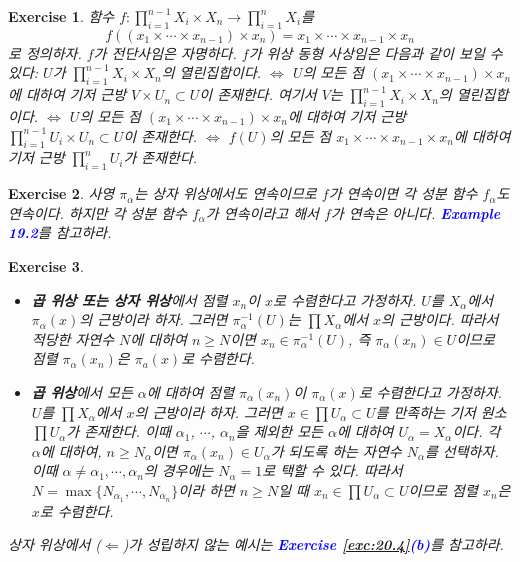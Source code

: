 \documentclass{article}
\newtheorem{exercise}{Exercise}[section]
\begin{document}
\begin{exercise}
    함수 $f:\prod_{i=1}^{n-1}X_i\times X_n\to\prod_{i=1}^nX_i$를
    \begin{equation*}
        f((x_1\times\cdots\times x_{n-1})\times x_n)=x_1\times\cdots\times x_{n-1}\times x_n
    \end{equation*}로 정의하자. $f$가 전단사임은 자명하다. $f$가 위상 동형 사상임은 다음과 같이 보일 수 있다: $U$가 $\prod_{i=1}^{n-1}X_i\times X_n$의 열린집합이다. $\Longleftrightarrow$ $U$의 모든 점 $(x_1\times\cdots\times x_{n-1})\times x_n$에 대하여 기저 근방 $V\times U_n\subset U$이 존재한다. 여기서 $V$는 $\prod_{i=1}^{n-1}X_i\times X_n$의 열린집합이다. $\Longleftrightarrow$ $U$의 모든 점 $(x_1\times\cdots\times x_{n-1})\times x_n$에 대하여 기저 근방 $\prod_{i=1}^{n-1}U_i\times U_n\subset U$이 존재한다. $\Longleftrightarrow$ $f(U)$의 모든 점 $x_1\times\cdots\times x_{n-1}\times x_n$에 대하여 기저 근방 $\prod_{i=1}^nU_i$가 존재한다.
\end{exercise}

\begin{exercise}
    사영 $\pi_\alpha$는 상자 위상에서도 연속이므로 $f$가 연속이면 각 성분 함수 $f_\alpha$도 연속이다. 하지만 각 성분 함수 $f_\alpha$가 연속이라고 해서 $f$가 연속은 아니다. \textcolor{blue}{\textbf{Example 19.2}}를 참고하라.
\end{exercise}

\begin{exercise}
	\label{exc:19.6}
    \phantom{}
    \begin{itemize}
        \item[($\Longrightarrow$)] \textbf{곱 위상 또는 상자 위상}에서 점렬 $x_n$이 $x$로 수렴한다고 가정하자. $U$를 $X_\alpha$에서 $\pi_\alpha(x)$의 근방이라 하자. 그러면 $\pi^{-1}_\alpha(U)$는 $\prod X_\alpha$에서 $x$의 근방이다. 따라서 적당한 자연수 $N$에 대하여 $n\geq N$이면 $x_n\in\pi^{-1}_\alpha(U)$, 즉 $\pi_\alpha(x_n)\in U$이므로 점렬 $\pi_\alpha(x_n)$은 $\pi_a(x)$로 수렴한다.
        \item[($\Longleftarrow$)] \textbf{곱 위상}에서 모든 $\alpha$에 대하여 점렬 $\pi_\alpha(x_n)$이 $\pi_\alpha(x)$로 수렴한다고 가정하자. $U$를 $\prod X_\alpha$에서 $x$의 근방이라 하자. 그러면 $x\in\prod U_\alpha\subset U$를 만족하는 기저 원소 $\prod U_\alpha$가 존재한다. 이때 $\alpha_1$, $\cdots$, $\alpha_n$을 제외한 모든 $\alpha$에 대하여 $U_\alpha=X_\alpha$이다. 각 $\alpha$에 대하여, $n\geq N_\alpha$이면 $\pi_\alpha(x_n)\in U_\alpha$가 되도록 하는 자연수 $N_\alpha$를 선택하자. 이때 $\alpha\ne\alpha_1,\cdots,\alpha_n$의 경우에는 $N_\alpha=1$로 택할 수 있다. 따라서 $N=\max\{N_{\alpha_1},\cdots,N_{\alpha_n}\}$이라 하면 $n\geq N$일 때 $x_n\in\prod U_\alpha\subset U$이므로 점렬 $x_n$은 $x$로 수렴한다.
    \end{itemize}
    상자 위상에서 ($\Longleftarrow$)가 성립하지 않는 예시는 \textcolor{blue}{\textbf{Exercise \ref{exc:20.4}(b)}}를 참고하라.
\end{exercise}
\end{document}
